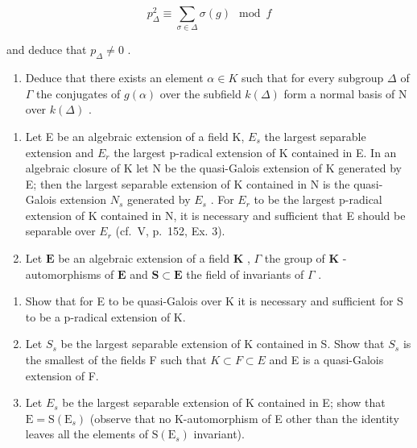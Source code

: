 \[
p _ {\Delta} ^ {2} \equiv \sum_ {\sigma \in \Delta} \sigma (g) \mod f
\]

and deduce that \(p_{\Delta} \neq 0\) .

\begin{enumerate}
\def\labelenumi{\alph{enumi})}
\setcounter{enumi}{1}
\tightlist
\item
  Deduce that there exists an element \(\alpha \in K\) such that for every subgroup \(\Delta\) of \(\Gamma\) the conjugates of \(g(\alpha)\) over the subfield \(k(\Delta)\) form a normal basis of N over \(k(\Delta)\) .
\end{enumerate}

\begin{enumerate}
\def\labelenumi{\arabic{enumi})}
\setcounter{enumi}{12}
\item
  Let E be an algebraic extension of a field K, \(E_{s}\) the largest separable extension and \(E_{r}\) the largest p-radical extension of K contained in E. In an algebraic closure of K let N be the quasi-Galois extension of K generated by E; then the largest separable extension of K contained in N is the quasi-Galois extension \(N_{s}\) generated by \(E_{s}\) . For \(E_{r}\) to be the largest p-radical extension of K contained in N, it is necessary and sufficient that E should be separable over \(E_{r}\) (cf.~V, p.~152, Ex. 3).
\item
  Let \(\mathbf{E}\) be an algebraic extension of a field \(\mathbf{K}\) , \(\Gamma\) the group of \(\mathbf{K}\) -automorphisms of \(\mathbf{E}\) and \(\mathbf{S} \subset \mathbf{E}\) the field of invariants of \(\Gamma\) .
\end{enumerate}

\begin{enumerate}
\def\labelenumi{\alph{enumi})}
\item
  Show that for E to be quasi-Galois over K it is necessary and sufficient for S to be a p-radical extension of K.
\item
  Let \(S_{s}\) be the largest separable extension of K contained in S. Show that \(S_{s}\) is the smallest of the fields F such that \(K \subset F \subset E\) and E is a quasi-Galois extension of F.
\item
  Let \(E_{s}\) be the largest separable extension of K contained in E; show that \(\mathrm{E} = \mathrm{S}(\mathrm{E}_{s})\) (observe that no K-automorphism of E other than the identity leaves all the elements of \(\mathrm{S}(\mathrm{E}_{s})\) invariant).
\end{enumerate}

